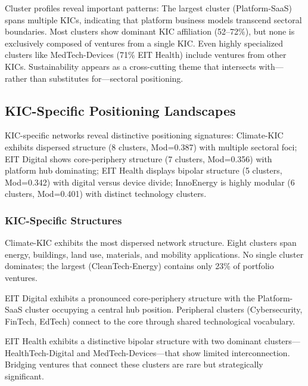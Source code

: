 \documentclass[../main.tex]{subfiles}
\begin{document}
Cluster profiles reveal important patterns: The largest cluster (Platform-SaaS) spans multiple KICs, indicating that platform business models transcend sectoral boundaries. Most clusters show dominant KIC affiliation (52--72\%), but none is exclusively composed of ventures from a single KIC. Even highly specialized clusters like MedTech-Devices (71\% EIT Health) include ventures from other KICs. Sustainability appears as a cross-cutting theme that intersects with---rather than substitutes for---sectoral positioning.

\subsection{KIC-Specific Positioning Landscapes}

KIC-specific networks reveal distinctive positioning signatures: Climate-KIC exhibits dispersed structure (8 clusters, Mod=0.387) with multiple sectoral foci; EIT Digital shows core-periphery structure (7 clusters, Mod=0.356) with platform hub dominating; EIT Health displays bipolar structure (5 clusters, Mod=0.342) with digital versus device divide; InnoEnergy is highly modular (6 clusters, Mod=0.401) with distinct technology clusters.

\subsubsection{KIC-Specific Structures}

Climate-KIC exhibits the most dispersed network structure. Eight clusters span energy, buildings, land use, materials, and mobility applications. No single cluster dominates; the largest (CleanTech-Energy) contains only 23\% of portfolio ventures.

EIT Digital exhibits a pronounced core-periphery structure with the Platform-SaaS cluster occupying a central hub position. Peripheral clusters (Cybersecurity, FinTech, EdTech) connect to the core through shared technological vocabulary.

EIT Health exhibits a distinctive bipolar structure with two dominant clusters---HealthTech-Digital and MedTech-Devices---that show limited interconnection. Bridging ventures that connect these clusters are rare but strategically significant.
\end{document}
